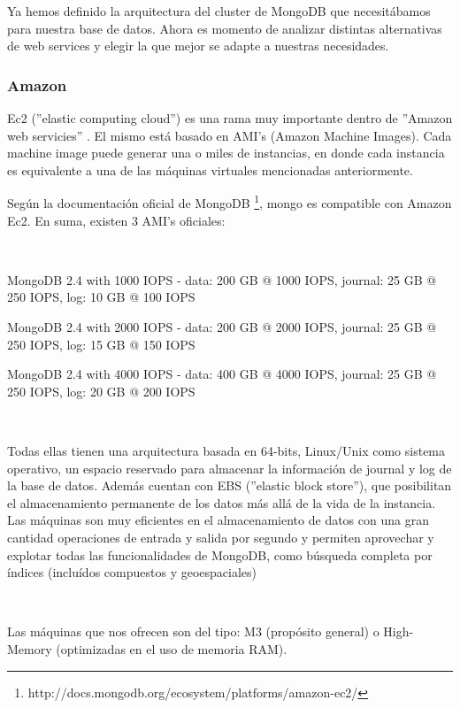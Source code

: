 Ya hemos definido la arquitectura del cluster de MongoDB que necesitábamos para nuestra base de datos. Ahora es
momento de analizar distintas alternativas de web services y elegir la que mejor se adapte a nuestras necesidades.

\subsubsection{Amazon}


Ec2 (''elastic computing cloud'') es una rama muy importante dentro de ''Amazon web servicies'' .
El mismo está basado en AMI's (Amazon Machine Images). Cada machine image puede generar una o miles de instancias,
en donde cada instancia es equivalente a una de las máquinas virtuales mencionadas anteriormente.


Según la documentación oficial de MongoDB \footnote{http://docs.mongodb.org/ecosystem/platforms/amazon-ec2/}, mongo es compatible con Amazon Ec2.
En suma, existen 3 AMI's oficiales: 

~

\begin{description}
	\item MongoDB 2.4 with 1000 IOPS - data: 200 GB @ 1000 IOPS, journal: 25 GB @ 250 IOPS, log: 10 GB @ 100 IOPS
	\item MongoDB 2.4 with 2000 IOPS - data: 200 GB @ 2000 IOPS, journal: 25 GB @ 250 IOPS, log: 15 GB @ 150 IOPS
	\item MongoDB 2.4 with 4000 IOPS - data: 400 GB @ 4000 IOPS, journal: 25 GB @ 250 IOPS, log: 20 GB @ 200 IOPS
\end{description}

~

Todas ellas tienen una arquitectura basada en 64-bits, Linux/Unix como sistema operativo, un espacio reservado
para almacenar la información de journal y log de la base de datos. Además cuentan con EBS (''elastic block store''),
que posibilitan el almacenamiento permanente de los datos más allá de la vida de la instancia. 
Las máquinas son muy eficientes en el almacenamiento de datos con una gran cantidad operaciones de entrada y salida
por segundo y permiten aprovechar y explotar todas las funcionalidades de MongoDB, como búsqueda completa por índices
(incluídos compuestos y geoespaciales)

~

Las máquinas que nos ofrecen son del tipo: M3 (propósito general) o High-Memory (optimizadas en el uso de memoria RAM).

